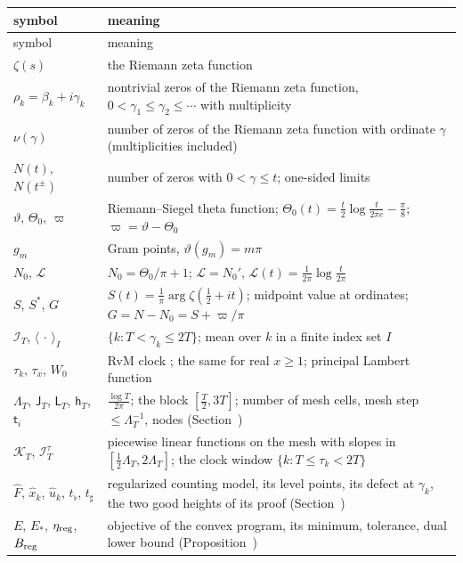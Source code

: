 \documentclass[preprint,12pt]{elsarticle}
\makeatletter
\let\CG@origref\ref
\let\CG@origeqref\eqref
\newcommand{\CG@gettip}[1]{\@ifundefined{CGTip@#1}{Reference: #1}{\csname CGTip@#1\endcsname}}
\DeclareRobustCommand{\CGref}[1]{\pdftooltip{\CG@origref{#1}}{\CG@gettip{#1}}}
\DeclareRobustCommand{\CGeqref}[1]{\pdftooltip{\CG@origeqref{#1}}{\CG@gettip{#1}}}
\numberwithin{equation}{section}
\theoremstyle{plain}
\theoremstyle{definition}
\theoremstyle{remark}
\newcommand{\NO}{N_0}
\newcommand{\lL}{\mathcal L}
\newcommand{\IT}{\mathcal I_T}
\makeatother
\begin{document}
\begin{center}
\small
\begin{longtable}{p{}p{}}
\toprule
symbol & meaning\\
\midrule
\endfirsthead
\toprule
symbol & meaning\\
\midrule
\endhead
\bottomrule
\endfoot
$\zeta(s)$ & the Riemann zeta function\\
$\rho_k=\beta_k+i\gamma_k$ & nontrivial zeros of the Riemann zeta function, $0<\gamma_1\le\gamma_2\le\cdots$ with multiplicity\\
$\nu(\gamma)$ & number of zeros of the Riemann zeta function with ordinate $\gamma$ (multiplicities included)\\
$N(t)$, $N(t^\pm)$ & number of zeros with $0<\gamma\le t$; one-sided limits\\
$\vartheta$, $\Theta_0$, $\varpi$ & Riemann--Siegel theta function; $\Theta_0(t)=\frac t2\log\frac t{2\pi e}-\frac\pi8$; $\varpi=\vartheta-\Theta_0$\\
$g_m$ & Gram points, $\vartheta(g_m)=m\pi$\\
$\NO$, $\lL$ & $\NO=\Theta_0/\pi+1$; $\lL=\NO'$, $\lL(t)=\frac1{2\pi}\log\frac t{2\pi}$\\
$S$, $S^*$, $G$ & $S(t)=\frac1\pi\arg\zeta(\frac12+it)$; midpoint value at ordinates; $G=N-\NO=S+\varpi/\pi$\\
$\IT$, $\langle\,\cdot\,\rangle_I$ & $\{k:T<\gamma_k\le2T\}$; mean over $k$ in a finite index set $I$\\
$\tau_k$, $\tau_x$, $W_0$ & RvM clock \CGeqref{eq:clock}; the same for real $x\ge1$; principal Lambert function\\
$\Lambda_T$, $\mathsf J_T$, $\mathsf L_T$, $\mathsf h_T$, $\mathsf t_i$ & $\frac{\log T}{2\pi}$; the block $[\frac T2,3T]$; number of mesh cells, mesh step $\le\Lambda_T^{-1}$, nodes (Section~\CGref{sec:regularized})\\
$\mathcal K_T$, $\mathcal I_T^\tau$ & piecewise linear functions on the mesh with slopes in $[\frac12\Lambda_T,2\Lambda_T]$; the clock window $\{k:T\le\tau_k<2T\}$\\
$\widehat F$, $\widehat x_k$, $\widehat u_k$, $t_\flat$, $t_\sharp$ & regularized counting model, its level points, its defect at $\gamma_k$, the two good heights of its proof (Section~\CGref{sec:regularized})\\
$E$, $E_*$, $\eta_{\rm reg}$, $B_{\rm reg}$ & objective of the convex program, its minimum, tolerance, dual lower bound (Proposition~\CGref{prop:tolerance})\\

\end{longtable}
\end{center}
\end{document}
